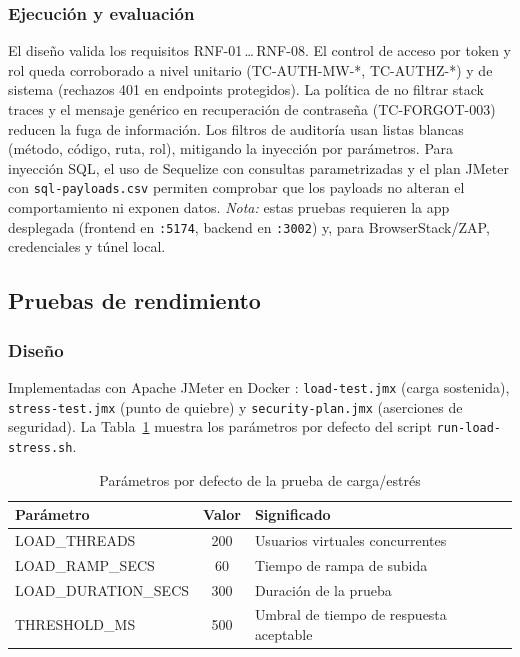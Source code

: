 \documentclass[stu,11pt,floatsintext]{apa7}
\begin{document}
\subsubsection{Ejecución y evaluación}
El diseño valida los requisitos RNF-01\,\ldots\,RNF-08. El control de acceso por token y
rol queda corroborado a nivel unitario (TC-AUTH-MW-*, TC-AUTHZ-*) y de sistema (rechazos
401 en endpoints protegidos). La política de no filtrar stack traces y el mensaje
genérico en recuperación de contraseña (TC-FORGOT-003) reducen la fuga de información.
Los filtros de auditoría usan listas blancas (método, código, ruta, rol), mitigando la
inyección por parámetros. Para inyección SQL, el uso de Sequelize con consultas
parametrizadas y el plan JMeter con \texttt{sql-payloads.csv} permiten comprobar que los
payloads no alteran el comportamiento ni exponen datos. \emph{Nota:} estas pruebas
requieren la app desplegada (frontend en \texttt{:5174}, backend en \texttt{:3002}) y,
para BrowserStack/ZAP, credenciales y túnel local.

\subsection{Pruebas de rendimiento}

\subsubsection{Diseño}
Implementadas con Apache JMeter en Docker \parencite{jmeter}: \texttt{load-test.jmx}
(carga sostenida), \texttt{stress-test.jmx} (punto de quiebre) y \texttt{security-plan.jmx}
(aserciones de seguridad). La Tabla~\ref{tab:perf} muestra los parámetros por defecto del
script \texttt{run-load-stress.sh}.

\begin{table}[H]
\centering
\caption{Parámetros por defecto de la prueba de carga/estrés}
\label{tab:perf}
\begin{tabularx}{\textwidth}{l c X}
\toprule
\textbf{Parámetro} & \textbf{Valor} & \textbf{Significado} \\
\midrule
LOAD\_THREADS & 200 & Usuarios virtuales concurrentes \\
LOAD\_RAMP\_SECS & 60 & Tiempo de rampa de subida \\
LOAD\_DURATION\_SECS & 300 & Duración de la prueba \\
THRESHOLD\_MS & 500 & Umbral de tiempo de respuesta aceptable \\
\bottomrule
\end{tabularx}
\end{table}
\end{document}
